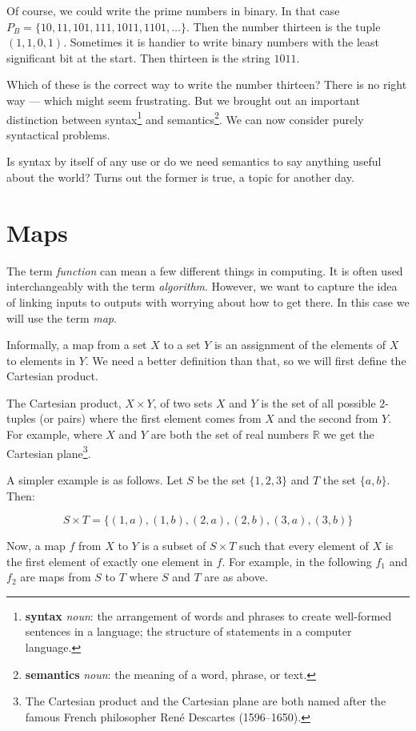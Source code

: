 \documentclass{iansnotes}
\begin{document}
  Of course, we could write the prime numbers in binary.
  In that case $P_B = \{ 10, 11, 101, 111, 1011, 1101, \ldots \}$.
  Then the number thirteen is the tuple $(1,1,0,1)$.
  Sometimes it is handier to write binary numbers with the least significant bit at the start.
  Then thirteen is the string $1011$.

  Which of these is the correct way to write the number thirteen?
  There is no right way --- which might seem frustrating.
  But we brought out an important distinction between syntax\footnote{\textbf{syntax} \emph{noun}: the arrangement of words and phrases to create well-formed sentences in a language; the structure of statements in a computer language.} and semantics\footnote{\textbf{semantics} \emph{noun}: the meaning of a word, phrase, or text.}.
  We can now consider purely syntactical problems.
  
  Is syntax by itself of any use or do we need semantics to say anything useful about the world?
  Turns out the former is true, a topic for another day.

\section{Maps}
  The term \emph{function} can mean a few different things in computing.
  It is often used interchangeably with the term \emph{algorithm}.
  However, we want to capture the idea of linking inputs to outputs with worrying about how to get there.
  In this case we will use the term \emph{map}.

  Informally, a map from a set $X$ to a set $Y$ is an assignment of the elements of $X$ to elements in $Y$\autocite[7]{sipser}.
  We need a better definition than that, so we will first define the Cartesian product.
  
  The Cartesian product, $X \times Y$, of two sets $X$ and $Y$ is the set of all possible $2$-tuples (or pairs) where the first element comes from $X$ and the second from $Y$.
  For example, where $X$ and $Y$ are both the set of real numbers $\mathbb{R}$ we get the Cartesian plane\footnote{The Cartesian product and the Cartesian plane are both named after the famous French philosopher Ren\'e Descartes (1596--1650).}.

  A simpler example is as follows.
  Let $S$ be the set $\{1, 2, 3\}$ and $T$ the set $\{a, b\}$.
  Then:

  \[S \times T = \{ (1,a), (1,b), (2,a), (2,b), (3,a), (3,b)\}\]

  Now, a map $f$ from $X$ to $Y$ is a subset of $S \times T$ such that every element of $X$ is the first element of exactly one element in $f$.
  For example, in the following $f_1$ and $f_2$ are maps from $S$ to $T$ where $S$ and $T$ are as above.
\end{document}
